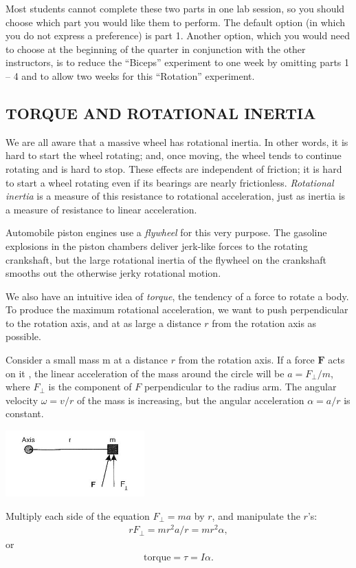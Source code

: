 Most students cannot complete these two parts in one lab session, so you should choose which part you would like them to perform.  The default option (in which you do not express a preference) is part 1.  Another option, which you would need to choose at the beginning of the quarter in conjunction with the other instructors, is to reduce the ``Biceps'' experiment to one week by omitting parts 1 -- 4 and to allow two weeks for this ``Rotation'' experiment.

\subsection*{TORQUE AND ROTATIONAL INERTIA}

We are all aware that a massive wheel has rotational inertia.  In other words, it is hard to start the wheel rotating; and, once moving, the wheel tends to continue rotating and is hard to stop.  These effects are independent of friction; it is hard to start a wheel rotating even if its bearings are nearly frictionless.  \textit{Rotational inertia} is a measure of this resistance to rotational acceleration, just as inertia is a measure of resistance to linear acceleration.

Automobile piston engines use a \textit{flywheel} for this very purpose.  The gasoline explosions in the piston chambers deliver jerk-like forces to the rotating crankshaft, but the large rotational inertia of the flywheel on the crankshaft smooths out the otherwise jerky rotational motion.

We also have an intuitive idea of \textit{torque}, the tendency of a force to rotate a body.  To produce the maximum rotational acceleration, we want to push perpendicular to the rotation axis, and at as large a distance \(r\) from the rotation axis as possible.

Consider a small mass m at a distance \(r\) from the rotation axis.  If a force \(\textbf{F}\) acts on it , the linear acceleration of the mass around the circle will be \(a = F_{\perp}/m\), where \(F_{\perp}\) is the component of \(F\) perpendicular to the radius arm.  The angular velocity \(\omega = v/r\) of the mass is increasing, but the angular acceleration \(\alpha = a/r\) is constant.
\begin{center} \includegraphics*[width=0.4\textwidth]{imgs/6labs/6Alab/6Aexp7/r_g_diagram1_fix.jpg} \end{center}
Multiply each side of the equation \(F_{\perp} = ma\) by \(r\), and manipulate the \(r\)'s:
\begin{align} rF_{\perp} = mr^2 a/r = mr^2\alpha, \end{align}
or
\begin{align} \textrm{torque} = \tau = I\alpha. \end{align}


